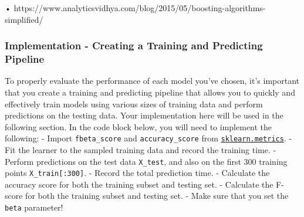 \documentclass[11pt]{article}
\begin{document}
•
https://www.analyticsvidhya.com/blog/2015/05/boosting-algorithms-simplified/

    \hypertarget{implementation---creating-a-training-and-predicting-pipeline}{%
\subsubsection{Implementation - Creating a Training and Predicting
Pipeline}\label{implementation---creating-a-training-and-predicting-pipeline}}

To properly evaluate the performance of each model you've chosen, it's
important that you create a training and predicting pipeline that allows
you to quickly and effectively train models using various sizes of
training data and perform predictions on the testing data. Your
implementation here will be used in the following section. In the code
block below, you will need to implement the following: - Import
\texttt{fbeta\_score} and \texttt{accuracy\_score} from
\href{http://scikit-learn.org/stable/modules/classes.html\#sklearn-metrics-metrics}{\texttt{sklearn.metrics}}.
- Fit the learner to the sampled training data and record the training
time. - Perform predictions on the test data \texttt{X\_test}, and also
on the first 300 training points \texttt{X\_train{[}:300{]}}. - Record
the total prediction time. - Calculate the accuracy score for both the
training subset and testing set. - Calculate the F-score for both the
training subset and testing set. - Make sure that you set the
\texttt{beta} parameter!
\end{document}
